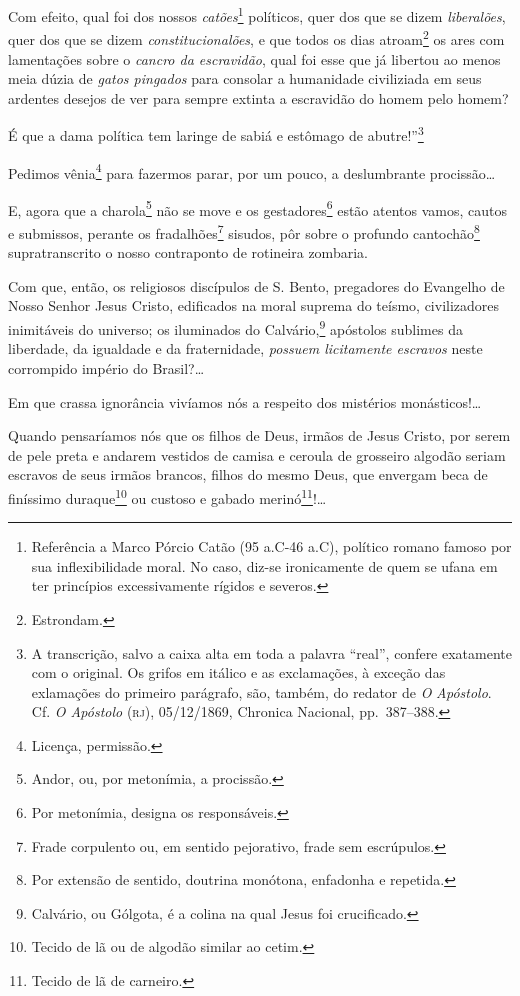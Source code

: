 Com efeito, qual foi dos nossos \emph{catões}\footnote{ Referência a
  Marco Pórcio Catão (95 a.C-46 a.C), político romano famoso por sua
  inflexibilidade moral. No caso, diz-se ironicamente de quem se ufana
  em ter princípios excessivamente rígidos e severos.} políticos, quer
dos que se dizem \emph{liberalões}, quer dos que se dizem
\emph{constitucionalões}, e que todos os dias atroam\footnote{
  Estrondam.} os ares com lamentações sobre o \emph{cancro da
escravidão}, qual foi esse que já libertou ao menos meia dúzia de
\emph{gatos pingados} para consolar a humanidade civiliziada em seus
ardentes desejos de ver para sempre extinta a escravidão do homem pelo
homem?

É que a dama política tem laringe de sabiá e estômago de
abutre!''\footnote{ A transcrição, salvo a caixa alta em toda a palavra
  ``real'', confere exatamente com o original. Os grifos em itálico e as
  exclamações, à exceção das exlamações do primeiro parágrafo, são,
  também, do redator de \emph{O} \emph{Apóstolo}. Cf. \emph{O Apóstolo}
  (\textsc{rj}), 05/12/1869, Chronica Nacional, pp.~387--388.}

Pedimos vênia\footnote{ Licença, permissão.} para fazermos parar, por
um pouco, a deslumbrante procissão\ldots{}

E, agora que a charola\footnote{ Andor, ou, por metonímia, a procissão.}
não se move e os gestadores\footnote{ Por metonímia, designa os
  responsáveis.} estão atentos vamos, cautos e submissos, perante os
fradalhões\footnote{ Frade corpulento ou, em sentido pejorativo, frade
  sem escrúpulos.} sisudos, pôr sobre o profundo cantochão\footnote{
  Por extensão de sentido, doutrina monótona, enfadonha e repetida.}
supratranscrito o nosso contraponto de rotineira zombaria.

Com que, então, os religiosos discípulos de S. Bento, pregadores do
Evangelho de Nosso Senhor Jesus Cristo, edificados na moral suprema do
teísmo, civilizadores inimitáveis do universo; os iluminados do
Calvário,\footnote{ Calvário, ou Gólgota, é a colina na qual Jesus foi
  crucificado.} apóstolos sublimes da liberdade, da igualdade e da
fraternidade, \emph{possuem licitamente escravos} neste corrompido
império do Brasil?\ldots{}

Em que crassa ignorância vivíamos nós a respeito dos mistérios
monásticos!\ldots{}

Quando pensaríamos nós que os filhos de Deus, irmãos de Jesus Cristo,
por serem de pele preta e andarem vestidos de camisa e ceroula de
grosseiro algodão seriam escravos de seus irmãos brancos, filhos do
mesmo Deus, que envergam beca de finíssimo duraque\footnote{ Tecido de
  lã ou de algodão similar ao cetim.} ou custoso e gabado
merinó\footnote{ Tecido de lã de carneiro.}!\ldots{}

